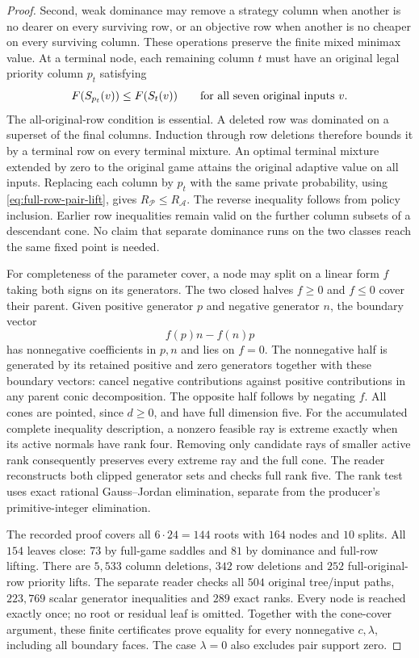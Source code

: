 \begin{proof}
Second, weak dominance may remove a strategy column when another is no
dearer on every surviving row, or an objective row when another is no
cheaper on every surviving column. These operations preserve the finite
mixed minimax value. At a terminal node, each remaining column $t$ must
have an original legal priority column $p_t$ satisfying
\begin{equation}\label{eq:full-row-pair-lift}
 F(S_{p_t}(v))\leq F(S_t(v))\qquad\hbox{for all seven original inputs }v.
\end{equation}
The all-original-row condition is essential. A deleted row was dominated
on a superset of the final columns. Induction through row deletions
therefore bounds it by a terminal row on every terminal mixture. An
optimal terminal mixture extended by zero to the original game attains
the original adaptive value on all inputs. Replacing each column by
$p_t$ with the same private probability, using
\eqref{eq:full-row-pair-lift}, gives $R_{\mathcal P}\leq R_{\mathcal A}$.
The reverse inequality follows from policy inclusion. Earlier row
inequalities remain valid on the further column subsets of a descendant
cone. No claim that separate dominance runs on the two classes reach the
same fixed point is needed.

For completeness of the parameter cover, a node may split on a linear
form $f$ taking both signs on its generators. The two closed halves
$f\geq0$ and $f\leq0$ cover their parent. Given positive generator $p$
and negative generator $n$, the boundary vector
\[
 f(p)n-f(n)p
\]
has nonnegative coefficients in $p,n$ and lies on $f=0$. The nonnegative
half is generated by its retained positive and zero generators together
with these boundary vectors: cancel negative contributions against
positive contributions in any parent conic decomposition. The opposite
half follows by negating $f$. All cones are pointed, since $d\geq0$, and
have full dimension five. For the accumulated complete inequality
description, a nonzero feasible ray is extreme exactly when its active
normals have rank four. Removing only candidate rays of smaller active
rank consequently preserves every extreme ray and the full cone. The
reader reconstructs both clipped generator sets and checks full rank
five. The rank test uses exact rational Gauss--Jordan elimination,
separate from the producer's primitive-integer elimination.

The recorded proof covers all $6\cdot24=144$ roots with $164$ nodes and
$10$ splits. All $154$ leaves close: $73$ by full-game saddles and $81$
by dominance and full-row lifting. There are $5{,}533$ column deletions,
$342$ row deletions and $252$ full-original-row priority lifts.
The separate reader checks all $504$ original tree/input paths,
$223{,}769$ scalar generator inequalities and $289$ exact ranks. Every
node is reached exactly once; no root or residual leaf is omitted.
Together with the cone-cover argument, these finite certificates prove
equality for every nonnegative $c,\lambda$, including all boundary faces.
The case $\lambda=0$ also excludes pair support zero.


\end{proof}
